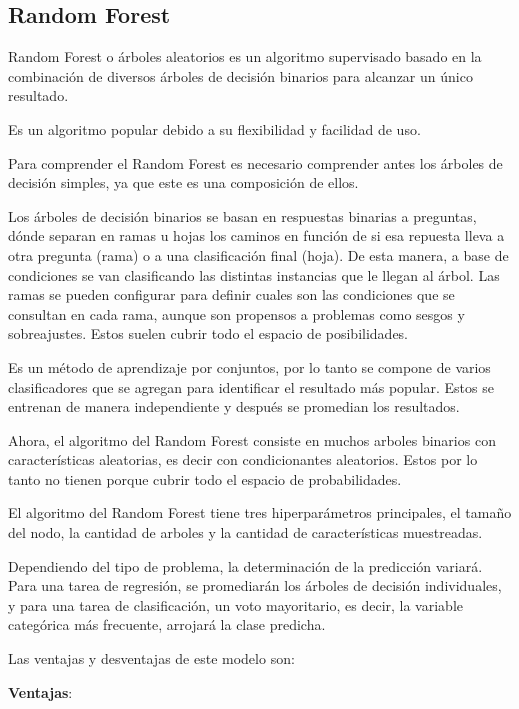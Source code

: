 \subsection{Random Forest}
Random Forest\cite{ibmWhatRandom} o árboles aleatorios es un algoritmo supervisado basado en la combinación de diversos árboles de decisión binarios para alcanzar un único resultado.

Es un algoritmo popular debido a su flexibilidad y facilidad de uso.

Para comprender el Random Forest es necesario comprender antes los árboles de decisión simples, ya que este es una composición de ellos.

Los árboles de decisión binarios se basan en respuestas binarias a preguntas, dónde separan en ramas u hojas los caminos en función de si esa repuesta lleva a otra pregunta (rama) o a una clasificación final (hoja). De esta manera, a base de condiciones se van clasificando las distintas instancias que le llegan al árbol. Las ramas se pueden configurar para definir cuales son las condiciones que se consultan en cada rama, aunque son propensos a problemas como sesgos y sobreajustes. Estos suelen cubrir todo el espacio de posibilidades.

Es un método de aprendizaje por conjuntos, por lo tanto se compone de varios clasificadores que se agregan para identificar el resultado más popular. Estos se entrenan de manera independiente y después se promedian los resultados.

Ahora, el algoritmo del Random Forest consiste en muchos arboles binarios con características aleatorias, es decir con condicionantes aleatorios. Estos por lo tanto no tienen porque cubrir todo el espacio de probabilidades.

El algoritmo del Random Forest tiene tres hiperparámetros principales, el tamaño del nodo, la cantidad de arboles y la cantidad de características muestreadas.

Dependiendo del tipo de problema, la determinación de la predicción variará. Para una tarea de regresión, se promediarán los árboles de decisión individuales, y para una tarea de clasificación, un voto mayoritario, es decir, la variable categórica más frecuente, arrojará la clase predicha.

Las ventajas y desventajas de este modelo son:

\textbf{Ventajas}:

